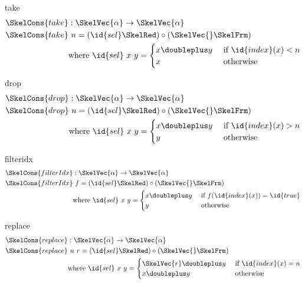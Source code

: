\documentclass[preview]{standalone}
\begin{document}
\begin{docimage}{take}
  \begin{align*}
    \SkelCons{take} &: \SkelVec{\alpha} \rightarrow \SkelVec{\alpha} \\
    \SkelCons{take} &\ n = (\id{sel} \SkelRed) \circ (\SkelVec{} \SkelFrm) \\
                   & \mbox{where }\id{sel}\ x\ y= \begin{cases}
                     x \doubleplus y &\mbox{ if } \id{index}(x) < n \\
                     x &\mbox{ otherwise}
                   \end{cases}
  \end{align*}
\end{docimage}

\begin{docimage}{drop}
  \begin{align*}
    \SkelCons{drop} &: \SkelVec{\alpha} \rightarrow \SkelVec{\alpha} \\
    \SkelCons{drop} &\ n = (\id{sel} \SkelRed) \circ (\SkelVec{} \SkelFrm) \\
                   & \mbox{where }\id{sel}\ x\ y= \begin{cases}
                     x \doubleplus y &\mbox{ if } \id{index}(x) > n \\
                     y &\mbox{ otherwise}
                   \end{cases}
  \end{align*}
\end{docimage}

\begin{docimage}{filteridx}
  \begin{align*}
    \SkelCons{filterIdx} &: \SkelVec{\alpha} \rightarrow \SkelVec{\alpha} \\
    \SkelCons{filterIdx} &\ f = (\id{sel} \SkelRed) \circ (\SkelVec{} \SkelFrm) \\
                   & \mbox{where }\id{sel}\ x\ y= \begin{cases}
                     x \doubleplus y &\mbox{ if } f(\id{index}(x)) = \id{true} \\
                     y &\mbox{ otherwise}
                   \end{cases}
  \end{align*}
\end{docimage}


\begin{docimage}{replace}
  \begin{align*}
    \SkelCons{replace} &: \SkelVec{\alpha} \rightarrow \SkelVec{\alpha} \\
    \SkelCons{replace} &\ n\ r = (\id{sel} \SkelRed) \circ (\SkelVec{} \SkelFrm) \\
                   & \mbox{where }\id{sel}\ x\ y= \begin{cases}
                     \SkelVec{r} \doubleplus y &\mbox{ if } \id{index}(x) = n \\
                     x \doubleplus y & \mbox{ otherwise}
                   \end{cases}
  \end{align*}
\end{docimage}
\end{document}
